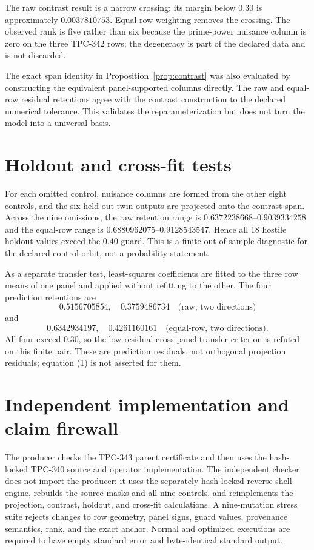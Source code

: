 \documentclass[11pt]{article}
\begin{document}
The raw contrast result is a narrow crossing: its margin below $0.30$ is
approximately $0.0037810753$.  Equal-row weighting removes the crossing.
The observed rank is five rather than six because the prime-power nuisance
column is zero on the three TPC-342 rows; the degeneracy is part of the
declared data and is not discarded.

The exact span identity in Proposition~\ref{prop:contrast} was also evaluated
by constructing the equivalent panel-supported columns directly.  The raw
and equal-row residual retentions agree with the contrast construction to the
declared numerical tolerance.  This validates the reparameterization but does
not turn the model into a universal basis.

\section{Holdout and cross-fit tests}

For each omitted control, nuisance columns are formed from the other eight
controls, and the six held-out twin outputs are projected onto the contrast
span.  Across the nine omissions, the raw retention range is
$0.6372238668$--$0.9039334258$ and the equal-row range is
$0.6880962075$--$0.9128543547$.  Hence all 18 hostile holdout values exceed
the $0.40$ guard.  This is a finite out-of-sample diagnostic for the declared
control orbit, not a probability statement.

As a separate transfer test, least-squares coefficients are fitted to the
three row means of one panel and applied without refitting to the other.  The
four prediction retentions are
\[
0.5156705854,\quad 0.3759486734
\quad\text{(raw, two directions)}
\]
and
\[
0.6342934197,\quad 0.4261160161
\quad\text{(equal-row, two directions)}.
\]
All four exceed $0.30$, so the low-residual cross-panel transfer criterion is
refuted on this finite pair.  These are prediction residuals, not orthogonal
projection residuals; equation (1) is not asserted for them.

\section{Independent implementation and claim firewall}

The producer checks the TPC-343 parent certificate and then uses the
hash-locked TPC-340 source and operator implementation.  The independent checker
does not import the producer: it uses the separately hash-locked reverse-shell
engine, rebuilds the source masks and all nine controls, and reimplements the
projection, contrast, holdout, and cross-fit calculations.  A nine-mutation
stress suite rejects changes to row geometry, panel signs, guard values,
provenance semantics, rank, and the exact anchor.  Normal and optimized
executions are required to have empty standard error and byte-identical
standard output.
\end{document}
